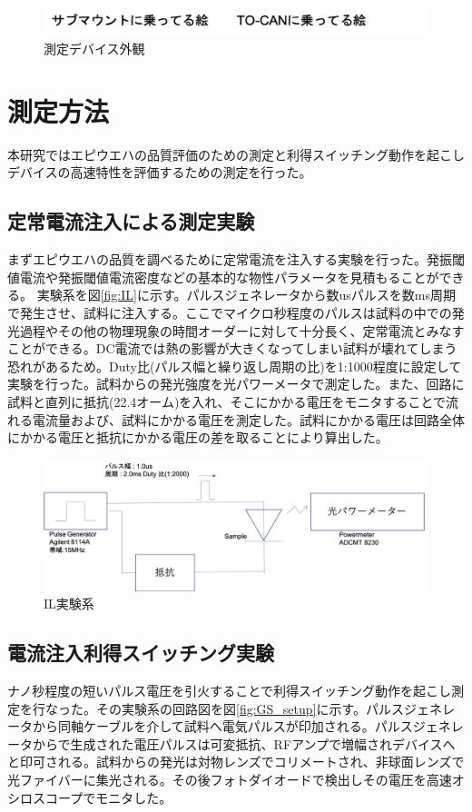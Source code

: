 \begin{figure}[t]
	\centering
	\includegraphics[width=15cm]{figure/fig_2_1_mount.png}
	\caption{測定デバイス外観}
	\label{fig_2_1_mount}
\end{figure}

\section{測定方法}%
本研究ではエピウエハの品質評価のための測定と利得スイッチング動作を起こしデバイスの高速特性を評価するための測定を行った。
\subsection{定常電流注入による測定実験}%
まずエピウエハの品質を調べるために定常電流を注入する実験を行った。発振閾値電流や発振閾値電流密度などの基本的な物性パラメータを見積もることができる。
実験系を図\ref{fig:IL}に示す。パルスジェネレータから数usパルスを数ms周期で発生させ、試料に注入する。ここでマイクロ秒程度のパルスは試料の中での発光過程やその他の物理現象の時間オーダーに対して十分長く、定常電流とみなすことができる。DC電流では熱の影響が大きくなってしまい試料が壊れてしまう恐れがあるため。Duty比(パルス幅と繰り返し周期の比)を1:1000程度に設定して実験を行った。試料からの発光強度を光パワーメータで測定した。また、回路に試料と直列に抵抗(22.4オーム)を入れ、そこにかかる電圧をモニタすることで流れる電流量および、試料にかかる電圧を測定した。試料にかかる電圧は回路全体にかかる電圧と抵抗にかかる電圧の差を取ることにより算出した。
\begin{figure}[htbp]
	\includegraphics[width=15cm]{figure/fig_2_2_IL_setup.png}
	\caption{IL実験系}
	\label{fig_2_2_IL_setup}
\end{figure}

\subsection{電流注入利得スイッチング実験}%
ナノ秒程度の短いパルス電圧を引火することで利得スイッチング動作を起こし測定を行なった。その実験系の回路図を図\ref{fig:GS_setup}に示す。パルスジェネレータから同軸ケーブルを介して試料へ電気パルスが印加される。パルスジェネレータからで生成された電圧パルスは可変抵抗、RFアンプで増幅されデバイスへと印可される。試料からの発光は対物レンズでコリメートされ、非球面レンズで光ファイバーに集光される。その後フォトダイオードで検出しその電圧を高速オシロスコープでモニタした。

